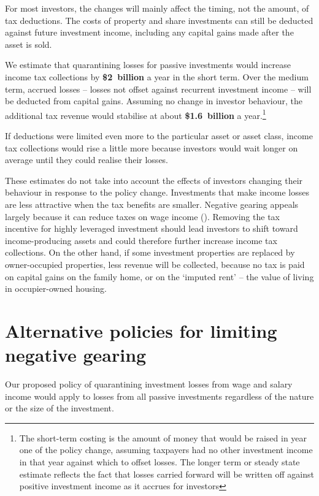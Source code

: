 For most investors, the changes will mainly affect the timing, not the amount, of tax deductions. The costs of property and share investments can still be deducted against future investment income, including any capital gains made after the asset is sold.

We estimate that quarantining losses for passive investments would increase income tax collections by \textbf{\$2~billion} a year in the short term. Over the medium term, accrued losses – losses not offset against recurrent investment income – will be deducted from capital gains. Assuming no change in investor behaviour, the additional tax revenue would stabilise at about \textbf{\$1.6~billion} a year.\footnote{The short-term costing is the amount of money that would be raised in year one of the policy change, assuming taxpayers had no other investment income in that year against which to offset losses. The longer term or steady state estimate reflects the fact that losses carried forward will be written off against positive investment income as it accrues for investors} 

If deductions were limited even more to the particular asset or asset class, income tax collections would rise a little more because investors would wait longer on average until they could realise their losses. 

These estimates do not take into account the effects of investors changing their behaviour in response to the policy change. Investments that make income losses are less attractive when the tax benefits are smaller. Negative gearing appeals largely because it can reduce taxes on wage income (). Removing the tax incentive for highly leveraged investment should lead investors to shift toward income-producing assets and could therefore further increase income tax collections. On the other hand, if some investment properties are replaced by owner-occupied properties, less revenue will be collected, because no tax is paid on capital gains on the family home, or on the ‘imputed rent’ – the value of living in occupier-owned housing.

\section{Alternative policies for limiting negative gearing}
Our proposed policy of quarantining investment losses from wage and salary income would apply to losses from all passive investments regardless of the nature or the size of the investment. 


